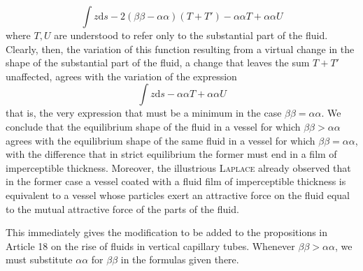 \[
\int z\mathrm{d}s-2(\beta\beta-\alpha\alpha)(T+T')-\alpha\alpha T+\alpha\alpha U
\]
where $T,U$ are understood to refer only to the substantial part of the fluid. Clearly, then, the variation of this function resulting from a virtual change in the shape of the substantial part of the fluid, a change that leaves the sum $T+T'$ unaffected, agrees with the variation of the expression
%
\[
\int z\mathrm{d}s-\alpha\alpha T+\alpha\alpha U
\]
that is, the very expression that must be a minimum in the case $\beta\beta=\alpha\alpha$. We conclude that the equilibrium shape of the fluid in a vessel for which $\beta\beta>\alpha\alpha$ agrees with the equilibrium shape of the same fluid in a vessel for which $\beta\beta=\alpha\alpha$, with the difference that in strict equilibrium the former must end in a film of imperceptible thickness. Moreover, the illustrious \textsc{Laplace} already observed that in the former case a vessel coated with a fluid film of imperceptible thickness is equivalent to a vessel whose particles exert an attractive force on the fluid equal to the mutual attractive force of the parts of the fluid.

This immediately gives the modification to be added to the propositions in Article 18 on the rise of fluids in vertical capillary tubes. Whenever $\beta\beta>\alpha\alpha$, we must substitute $\alpha\alpha$ for $\beta\beta$ in the formulas given there.

